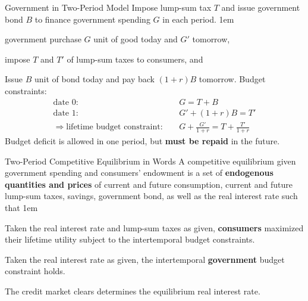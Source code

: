 \documentclass[11pt,aspectratio=43,usenames,dvipsnames]{beamer}
\let\olditemize=\itemize
\let\endolditemize=\enditemize
\renewenvironment{itemize}{\olditemize \itemsep1em}{\endolditemize}
\let\oldenumerate=\enumerate
\let\endoldenumerate=\endenumerate
\renewenvironment{enumerate}{\oldenumerate \itemsep1em}{ \endoldenumerate}
\theoremstyle{definition}
\begin{document}
\begin{frame}{Government in Two-Period Model}
\label{slide:Government_in_Two_Period_Model}
    Impose \alert{lump-sum tax} $ T $ and issue \alert{government bond} $ B $ to finance \alert{government spending} $ G $ in each period.
    \begin{itemize}
        \item government purchase $ G $ unit of good today and $ G' $ tomorrow,
        \item impose $ T $ and $ T' $ of lump-sum taxes to consumers, and
        \item Issue $ B $ unit of bond today and pay back $ ( 1+r ) B $ tomorrow.
    \end{itemize}
    Budget constraints:
    \begin{align}
        \text{date 0}: \quad
            & G = T + B
        \\
        \text{date 1}: \quad
            & G' + ( 1+r ) B = T'
        \\
        \Rightarrow \text{lifetime budget constraint}: \quad
            & G + \frac{G'}{1+r} = T + \frac{T'}{1+r}
    \end{align}
    Budget deficit is allowed in one period, but \textbf{must be repaid} in the future.
\end{frame}

\begin{frame}{Two-Period Competitive Equilibrium in Words}
\label{slide:Two_Period_Competitive_Equilibrium_in_Words}
A competitive equilibrium given \alert{government spending} and \alert{consumers' endowment} is a set of \textbf{endogenous quantities and prices} of \alert{current and future consumption}, \alert{current and future lump-sum taxes}, \alert{savings}, \alert{government bond}, as well as the \alert{real interest rate} such that
\begin{enumerate}
    \item Taken the real interest rate and lump-sum taxes as given, \textbf{consumers} maximized their lifetime utility subject to the intertemporal budget constraints.
    \item Taken the real interest rate as given, the intertemporal \textbf{government} budget constraint holds.
    \item The credit market clears determines the equilibrium real interest rate.
\end{enumerate}
\end{frame}
\end{document}

